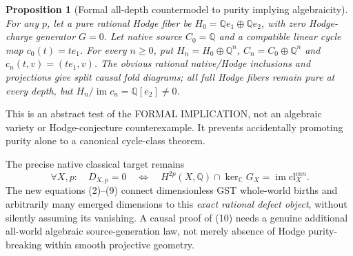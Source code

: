 \documentclass[11pt]{article}
\newtheorem{proposition}[theorem]{Proposition}
\begin{document}
\begin{proposition}[Formal all-depth countermodel to purity implying algebraicity]
For any $p$, let a pure rational Hodge fiber be
$H_0=\mathbb Q e_1\oplus\mathbb Q e_2$, with zero
Hodge-charge generator $G=0$. Let native source $C_0=\mathbb Q$
and a compatible linear cycle map $c_0(t)=t e_1$.
For every $n\ge0$, put $H_n=H_0\oplus\mathbb Q^n$,
$C_n=C_0\oplus\mathbb Q^n$ and
$c_n(t,v)=(t e_1,v)$.
The obvious rational native/Hodge inclusions and
projections give split causal fold diagrams;
all full Hodge fibers remain pure at every depth,
but $H_n/\operatorname{im}c_n=\mathbb Q[e_2]\ne0$.
\end{proposition}
This is an abstract test of the FORMAL IMPLICATION,
not an algebraic variety or Hodge-conjecture
counterexample. It prevents accidentally promoting
purity alone to a canonical cycle-class theorem.

The precise native classical target remains
\[
 \boxed{\,\forall X,p:\quad
  D_{X,p}=0\quad\Longleftrightarrow\quad
  H^{2p}(X,\mathbb Q)\cap\ker_{\mathbb C}G_X
    =\operatorname{im}\mathrm{cl}^{can}_X.}        \tag{10}
\]
The new equations (2)--(9) connect dimensionless GST
whole-world births and arbitrarily many emerged dimensions
to this \emph{exact rational defect object}, without
silently assuming its vanishing. A causal proof of
(10) needs a genuine additional all-world algebraic
source-generation law, not merely absence of Hodge
purity-breaking within smooth projective geometry.
\end{document}

